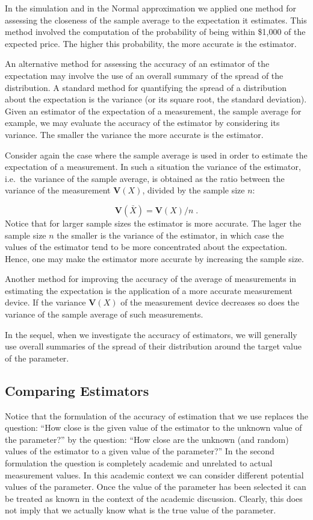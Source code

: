 \documentclass[]{krantz}
\newcommand{\Var}{\mathbf{V}}
\theoremstyle{definition}
\theoremstyle{definition}
\theoremstyle{definition}
\theoremstyle{remark}
\begin{document}
In the simulation and in the Normal approximation we applied one method
for assessing the closeness of the sample average to the expectation it
estimates. This method involved the computation of the probability of
being within \$1,000 of the expected price. The higher this probability,
the more accurate is the estimator.

An alternative method for assessing the accuracy of an estimator of the
expectation may involve the use of an overall summary of the spread of
the distribution. A standard method for quantifying the spread of a
distribution about the expectation is the variance (or its square root,
the standard deviation). Given an estimator of the expectation of a
measurement, the sample average for example, we may evaluate the
accuracy of the estimator by considering its variance. The smaller the
variance the more accurate is the estimator.

Consider again the case where the sample average is used in order to
estimate the expectation of a measurement. In such a situation the
variance of the estimator, i.e.~the variance of the sample average, is
obtained as the ratio between the variance of the measurement \(\Var(X)\),
divided by the sample size \(n\):

\[\Var(\bar X) = \Var(X)/n\;.\] Notice
that for larger sample sizes the estimator is more accurate. The lager
the sample size \(n\) the smaller is the variance of the estimator, in
which case the values of the estimator tend to be more concentrated
about the expectation. Hence, one may make the estimator more accurate
by increasing the sample size.

Another method for improving the accuracy of the average of measurements
in estimating the expectation is the application of a more accurate
measurement device. If the variance \(\Var(X)\) of the measurement device
decreases so does the variance of the sample average of such
measurements.

In the sequel, when we investigate the accuracy of estimators, we will
generally use overall summaries of the spread of their distribution
around the target value of the parameter.

\hypertarget{ComparingEstimators}{%
\subsection{Comparing Estimators}\label{ComparingEstimators}}

Notice that the formulation of the accuracy of estimation that we use
replaces the question: ``How close is the given value of the estimator to
the unknown value of the parameter?'' by the question: ``How close are the
unknown (and random) values of the estimator to a given value of the
parameter?'' In the second formulation the question is completely
academic and unrelated to actual measurement values. In this academic
context we can consider different potential values of the parameter.
Once the value of the parameter has been selected it can be treated as
known in the context of the academic discussion. Clearly, this does not
imply that we actually know what is the true value of the parameter.
\end{document}
